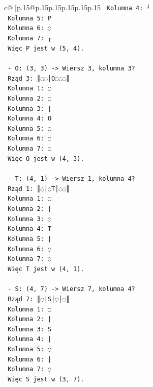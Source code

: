 \documentclass{article}
\begin{document}
{\begin{supertabular}{c@{$\;$}|p{.15\linewidth}@{}p{.15\linewidth}p{.15\linewidth}p{.15\linewidth}p{.15\linewidth}p{.15\linewidth}}
{{{\texttt{    Kolumna 4: ┘} \\
\texttt{    Kolumna 5: P} \\
\texttt{    Kolumna 6: ◌} \\
\texttt{    Kolumna 7: ┌} \\
\texttt{    Więc P jest w (5, 4).} \\
\\ 
\texttt{  {-} O: (3, 3) {-}> Wiersz 3, kolumna 3?} \\
\texttt{    Rząd 3: ║◌◌│O◌◌◌║} \\
\texttt{    Kolumna 1: ◌} \\
\texttt{    Kolumna 2: ◌} \\
\texttt{    Kolumna 3: |} \\
\texttt{    Kolumna 4: O} \\
\texttt{    Kolumna 5: ◌} \\
\texttt{    Kolumna 6: ◌} \\
\texttt{    Kolumna 7: ◌} \\
\texttt{    Więc O jest w (4, 3).} \\
\\ 
\texttt{  {-} T: (4, 1) {-}> Wiersz 1, kolumna 4?} \\
\texttt{    Rząd 1: ║◌│◌T│◌◌║} \\
\texttt{    Kolumna 1: ◌} \\
\texttt{    Kolumna 2: |} \\
\texttt{    Kolumna 3: ◌} \\
\texttt{    Kolumna 4: T} \\
\texttt{    Kolumna 5: |} \\
\texttt{    Kolumna 6: ◌} \\
\texttt{    Kolumna 7: ◌} \\
\texttt{    Więc T jest w (4, 1).} \\
\\ 
\texttt{  {-} S: (4, 7) {-}> Wiersz 7, kolumna 4?} \\
\texttt{    Rząd 7: ║◌│S│◌│◌║} \\
\texttt{    Kolumna 1: ◌} \\
\texttt{    Kolumna 2: |} \\
\texttt{    Kolumna 3: S} \\
\texttt{    Kolumna 4: |} \\
\texttt{    Kolumna 5: ◌} \\
\texttt{    Kolumna 6: |} \\
\texttt{    Kolumna 7: ◌} \\
\texttt{    Więc S jest w (3, 7).} \\
}}}
\end{supertabular}}
\end{document}
